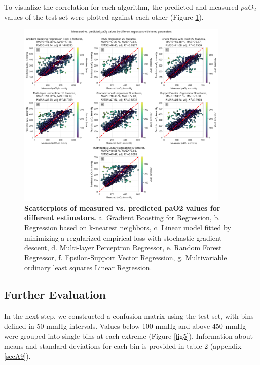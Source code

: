 \documentclass[referee,lineno,pdflatex,sn-nature]{sn-jnl}%
\theoremstyle{thmstyleone}%
\theoremstyle{thmstyletwo}%
\theoremstyle{thmstylethree}%
\begin{document}
To visualize the correlation for each algorithm, the predicted and measured $paO_2$ values of the test set were plotted against each other (Figure \ref{fig4}). 

\begin{figure}[h]
\centering
\includegraphics[width=0.9\textwidth]{images/Figure4.png}
\caption{\textbf{Scatterplots of measured vs. predicted paO2 values for different estimators.} a. Gradient Boosting for Regression, b. Regression based on k-nearest neighbors, c. Linear model fitted by minimizing a regularized empirical loss with stochastic gradient descent, d. Multi-layer Perceptron Regressor, e. Random Forest Regressor, f. Epsilon-Support Vector Regression, g. Multivariable ordinary least squares Linear Regression.}\label{fig4}
\end{figure}

\subsection{Further Evaluation}\label{sec3.6}
In the next step, we constructed a confusion matrix using the test set, with bins defined in 50 mmHg intervals. Values below 100 mmHg and above 450 mmHg were grouped into single bins at each extreme (Figure \ref{fig5}). Information about means and standard deviations for each bin is provided in table 2 (appendix \ref{secA9}).
\end{document}
